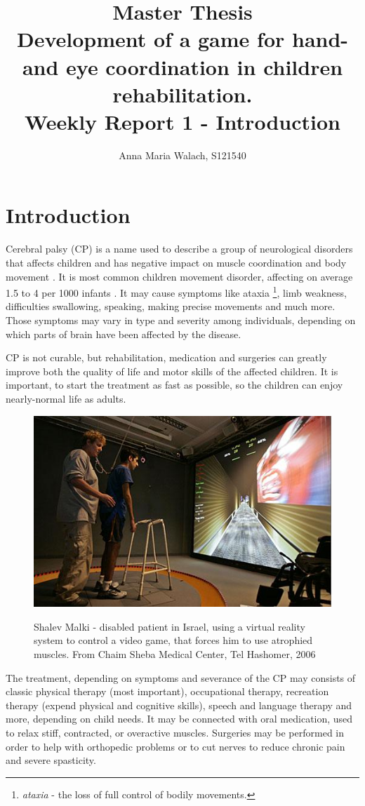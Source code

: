 \documentclass[10pt,a4paper]{article}
\title{{Master Thesis\\[0.5em]}
       {\bf \huge Development of a game for hand- and eye coordination in children rehabilitation.\\[0.5em]}
       {\bf Weekly Report 1 - Introduction }}
\author{Anna Maria Walach, S121540}
\begin{document}
\maketitle

\section*{Introduction }
Cerebral palsy (CP) is a name used to describe a group of neurological disorders that affects children and has negative impact on muscle coordination and body movement \cite{main_site}. It is most common children movement disorder, affecting on average 1.5 to 4 per 1000 infants \cite{stats}. It may cause symptoms like ataxia \footnote{\textit{ataxia} - the loss of full control of bodily movements.}, limb weakness, difficulties swallowing, speaking, making precise movements and much more. Those symptoms may vary in type and severity among individuals, depending on which parts of brain have been affected by the disease. 

CP is not curable, but rehabilitation, medication and surgeries can greatly improve both the quality of life and motor skills of the affected children. It is important, to start the treatment as fast as possible, so the children can enjoy nearly-normal life as adults.

\begin{figure}
\includegraphics[scale=1]{../images/rehab_example.JPG} 
\label{img:example}
\caption{Shalev Malki - disabled patient in Israel, using a virtual reality system to control a video game, that forces him to use atrophied muscles. From Chaim Sheba Medical Center, Tel Hashomer, 2006}
\end{figure}

The treatment, depending on symptoms and severance of the CP may consists of classic physical therapy (most important), occupational therapy, recreation therapy (expend physical and cognitive skills), speech and language therapy and more, depending on child needs. It may be connected with oral medication, used to relax stiff, contracted, or overactive muscles. Surgeries may be performed in order to help with orthopedic problems or to cut nerves to reduce chronic pain and severe spasticity.
\end{document}
